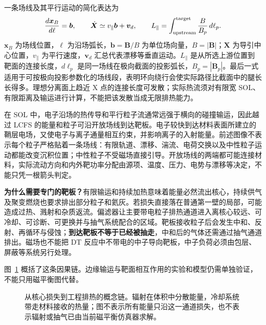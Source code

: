 \documentclass[12pt,fontset=none]{ctexart}
\numberwithin{equation}{section}
\numberwithin{table}{section}
\numberwithin{figure}{section}
\begin{document}
一条场线及其平行运动的简化表达为
\begin{equation}\label{eq:edge-follow}
 \frac{d\bm x_B}{d\ell}=\bm b,\qquad
 \dot{\bm X}\simeq v_\parallel\bm b+\bm v_d,\qquad
 L_\parallel=\int_{\rm upstream}^{\rm target}\frac{B}{B_p}\,d\ell_p .
\end{equation}
$\bm x_B$ 为场线位置，$\ell$ 为沿场弧长，$\bm b=\bm B/B$ 为单位场向量，$B=|\bm B|$；$\bm X$ 为导引中心位置，$v_\parallel$ 为平行速度，$\bm v_d$ 汇总代表漂移等垂直运动。$L_\parallel$ 是从所选上游位置到靶面的连接长度，$d\ell_p$ 是同一场线在极向截面的投影弧长，$B_p=|\bm B_p|$。最后一式适用于可按极向投影参数化的场线段，表明环向绕行会使实际路径比截面中的腿长长得多。理想分离面上趋近 X 点的连接长度可发散；实际热流须对有限宽 SOL、有限距离及输运进行计算，不能把该发散当成无限排热能力。

在 SOL 中，电子沿场的热传导和平行粒子流通常远强于横向的碰撞输运，因此越过 LCFS 的能量和粒子可沿开放场线到达靶板。电子较快到达材料表面所建立的鞘层电场，又使电子与离子通量相互约束，并影响离子的入射能量。前述图像不表示每个粒子严格贴着一条场线：有限轨道、漂移、湍流、电荷交换以及中性粒子运动都能改变沉积位置；中性粒子不受磁场直接引导。开放场线的两端都可能连接材料，实际流动方向和内外靶功率分配由源项、温度、压力、电势与漂移等决定，不能只凭一根箭头判定。

\textbf{为什么需要专门的靶板？}有限输运和持续加热意味着能量必然流出核心，持续供气及聚变燃烧也要求排出部分粒子和氦灰。若损失直接落在普通第一壁的局部，可能造成过热、溅射和杂质返流。偏滤器让主要带电粒子排热通道进入离核心较远、可冷却、可诊断、可更换并与抽气系统配合的区域。靶板接收粒子后会发生中和、反射、再循环与侵蚀；\textbf{到达靶板不等于已经被抽走}，中和后的气体还需通过抽气通道排出。磁场也不能把 DT 反应中不带电的中子导向靶板，中子负荷必须由包层、屏蔽等系统另行处理。

图~\ref{fig:edge-exhaust-chain} 概括了这条因果链。边缘输运与靶面相互作用的实验和模型仍需单独验证，不能只用磁平衡图代替\cite{Dsol,Ddetach}。

\begin{figure}[htbp]
\centering
{}
\caption{从核心损失到工程排热的概念链。辐射在体积中分散能量，冷却系统带走材料接收的热量；图不表示所有能量只沿这一通道损失，也不表示辐射或抽气已由当前磁平衡仿真器求解。}\label{fig:edge-exhaust-chain}
\end{figure}
\end{document}
